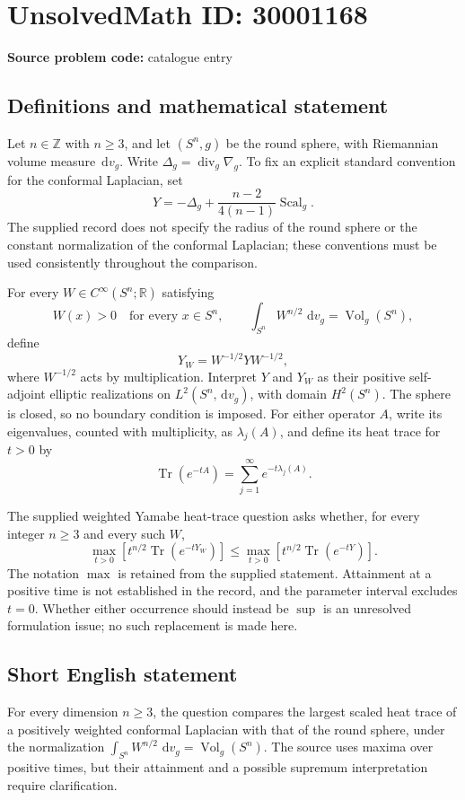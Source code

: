\documentclass[11pt]{article}
\newcommand{\Z}{\mathbb{Z}}
\newcommand{\R}{\mathbb{R}}
\newcommand{\dd}{\,\mathrm{d}}
\begin{document}
\section*{UnsolvedMath ID: 30001168}
\textbf{Source problem code:} catalogue entry
\subsection{Definitions and mathematical statement}
Let \(n\in\Z\) with \(n\geq3\), and let \((S^n,g)\) be the round sphere, with Riemannian volume measure \(\dd v_g\). Write \(\Delta_g=\operatorname{div}_g\nabla_g\). To fix an explicit standard convention for the conformal Laplacian, set
\[
Y=-\Delta_g+\frac{n-2}{4(n-1)}\operatorname{Scal}_g.
\]
The supplied record does not specify the radius of the round sphere or the constant normalization of the conformal Laplacian; these conventions must be used consistently throughout the comparison.

For every \(W\in C^\infty(S^n;\R)\) satisfying
\[
W(x)>0\quad\text{for every }x\in S^n,
\qquad
\int_{S^n}W^{n/2}\,\dd v_g=\operatorname{Vol}_g(S^n),
\]
define
\[
Y_W=W^{-1/2}YW^{-1/2},
\]
where \(W^{-1/2}\) acts by multiplication. Interpret \(Y\) and \(Y_W\) as their positive self-adjoint elliptic realizations on \(L^2(S^n,\dd v_g)\), with domain \(H^2(S^n)\). The sphere is closed, so no boundary condition is imposed. For either operator \(A\), write its eigenvalues, counted with multiplicity, as \(\lambda_j(A)\), and define its heat trace for \(t>0\) by
\[
\operatorname{Tr}(e^{-tA})=\sum_{j=1}^{\infty}e^{-t\lambda_j(A)}.
\]

The supplied weighted Yamabe heat-trace question asks whether, for every integer \(n\geq3\) and every such \(W\),
\[
\max_{t>0}\left[t^{n/2}\operatorname{Tr}(e^{-tY_W})\right]
\leq
\max_{t>0}\left[t^{n/2}\operatorname{Tr}(e^{-tY})\right].
\]
The notation \(\max\) is retained from the supplied statement. Attainment at a positive time is not established in the record, and the parameter interval excludes \(t=0\). Whether either occurrence should instead be \(\sup\) is an unresolved formulation issue; no such replacement is made here.
\subsection{Short English statement}
For every dimension \(n\geq3\), the question compares the largest scaled heat trace of a positively weighted conformal Laplacian with that of the round sphere, under the normalization \(\int_{S^n}W^{n/2}\,\dd v_g=\operatorname{Vol}_g(S^n)\). The source uses maxima over positive times, but their attainment and a possible supremum interpretation require clarification.
\end{document}
